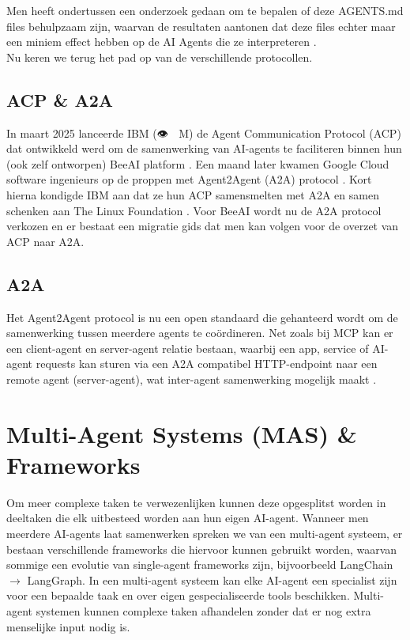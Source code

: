 Men heeft ondertussen een onderzoek gedaan om te bepalen of deze AGENTS.md files behulpzaam zijn, waarvan de resultaten aantonen dat deze files echter maar een miniem effect hebben op de AI Agents die ze interpreteren \autocite{gloaguen2026}. \\

Nu keren we terug het pad op van de verschillende protocollen.

\subsection{ACP \& A2A}
\label{ssec:acpanda2a}
In maart 2025 lanceerde IBM ({\emojifont 👁} {\emojifont 🐝} M) de Agent Communication Protocol (ACP) dat ontwikkeld werd om de samenwerking van AI-agents te faciliteren binnen hun (ook zelf ontworpen) BeeAI platform \autocite{Blair2025}. Een maand later kwamen Google Cloud software ingenieurs op de proppen met Agent2Agent (A2A) protocol \autocite{Google2025}. Kort hierna kondigde IBM aan dat ze hun ACP samensmelten met A2A en samen schenken aan The Linux Foundation \autocite{Blair2025}. Voor BeeAI wordt nu de A2A protocol verkozen en er bestaat een migratie gids dat men kan volgen voor de overzet van ACP naar A2A.

\subsection{A2A}
\label{ssec:a2a}
Het Agent2Agent protocol is nu een open standaard die gehanteerd wordt om de samenwerking tussen meerdere agents te coördineren. Net zoals bij MCP kan er een client-agent en server-agent relatie bestaan, waarbij een app, service of AI-agent requests kan sturen via een A2A compatibel HTTP-endpoint naar een remote agent (server-agent), wat inter-agent samenwerking mogelijk maakt \autocite{IBMe}.

\section{Multi-Agent Systems (MAS) \& Frameworks}
\label{sec:multi-agentsystemsmasandfraameworks}
Om meer complexe taken te verwezenlijken kunnen deze opgesplitst worden in deeltaken die elk uitbesteed worden aan hun eigen AI-agent. Wanneer men meerdere AI-agents laat samenwerken spreken we van een multi-agent systeem, er bestaan verschillende frameworks die hiervoor kunnen gebruikt worden, waarvan sommige een evolutie van single-agent frameworks zijn, bijvoorbeeld LangChain $\rightarrow$ LangGraph. In een multi-agent systeem kan elke AI-agent een specialist zijn voor een bepaalde taak en over eigen gespecialiseerde tools beschikken. Multi-agent systemen kunnen complexe taken afhandelen zonder dat er nog extra menselijke input nodig is.\\

